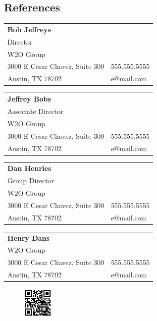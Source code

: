 \documentclass[margin,line]{resume}
\begin{document}
\begin{resume}

\vspace{1em}

\section{\mysidestyle References}


\begin{tabular}{@{}p{9cm}p{3cm}}
\textbf{Bob Jeffreys}\\
Director\\
W2O Group\\
3000 E Cesar Chavez, Suite 300                 &  555.555.5555\\
Austin, TX 78702                     &  e@mail.com\\
\end{tabular}

\begin{tabular}{@{}p{9cm}p{3cm}}
\textbf{Jeffrey Bobs}\\
Associate Director\\
W2O Group\\
3000 E Cesar Chavez, Suite 300                 &  555.555.5555\\
Austin, TX 78702                     &  e@mail.com\\
\end{tabular}

\begin{tabular}{@{}p{9cm}p{3cm}}
\textbf{Dan Henries}\\
Group Director\\
W2O Group\\
3000 E Cesar Chavez, Suite 300                 &  555.555.5555\\
Austin, TX 78702                     &  e@mail.com\\
\end{tabular}

\begin{tabular}{@{}p{9cm}p{3cm}}
\textbf{Henry Dans}\\
W2O Group\\
3000 E Cesar Chavez, Suite 300                 &  555.555.5555\\
Austin, TX 78702                     &  e@mail.com\\
\end{tabular}


\end{resume}

\begin{figure}[b]
\hfill \includegraphics[scale=2.0]{assets/qr}
\end{figure}
\end{document}
